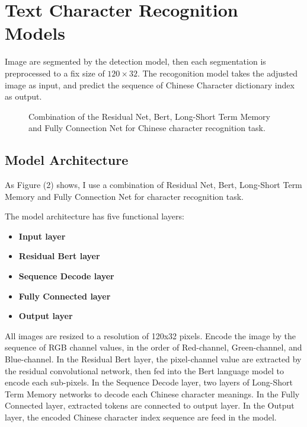 \documentclass[review]{cvpr}
\begin{document}

\section{Text Character Recognition Models}

  Image are segmented by the detection model, then each segmentation is preprocessed to a fix size of $120\times32$.
The recogonition model takes the adjusted image as input, and predict the sequence of Chinese Character dictionary index as output.


\begin{figure*}
\begin{center}
\end{center}
   \caption{Combination of the Residual Net, Bert, Long-Short Term Memory and Fully Connection Net for Chinese character recognition task.}
\label{fig:short}
\end{figure*}

\subsection{Model Architecture}

 As Figure (2) shows, I use a combination of Residual Net, Bert, Long-Short Term Memory and Fully Connection Net for character recognition task.

The model architecture has five functional layers:

\begin{itemize}
\item {\bf Input layer}
\item {\bf Residual Bert layer}
\item {\bf Sequence Decode layer}
\item {\bf Fully Connected layer}
\item {\bf Output layer}
\end{itemize}

All images are resized to a resolution of 120x32 pixels.
Encode the image by the sequence of RGB channel values, in the order of Red-channel, Green-channel, and Blue-channel.
In the Residual Bert  layer, the pixel-channel value are extracted by the residual convolutional network,
then fed into the Bert language model to encode each sub-pixels.
In the Sequence Decode layer, two layers of Long-Short Term Memory networks to decode each Chinese character meanings.
In the Fully Connected layer, extracted tokens are connected to output layer.
In the Output layer, the encoded Chinese character index sequence are feed in the model.
\end{document}
